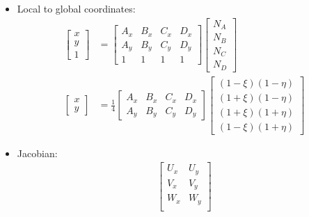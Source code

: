 \documentclass[10pt]{article}
\begin{document}
\begin{itemize}
    \item Local to global coordinates:
        \begin{align}
            \begin{bmatrix}
                x \\
                y \\
                1
            \end{bmatrix}
            &=
            \begin{bmatrix}
                A_x & B_x & C_x & D_x \\
                A_y & B_y & C_y & D_y \\
                1 & 1 & 1 & 1
            \end{bmatrix} 
            \begin{bmatrix}
                N_A \\
                N_B \\
                N_C \\
                N_D
            \end{bmatrix} \\
            \begin{bmatrix}
                x \\
                y 
            \end{bmatrix}
            &=
            \frac{1}{4}
            \begin{bmatrix}
                A_x & B_x & C_x & D_x \\
                A_y & B_y & C_y & D_y
            \end{bmatrix} 
            \begin{bmatrix}
                (1 - \xi)(1 - \eta) \\
                (1 + \xi)(1 - \eta) \\
                (1 + \xi)(1 + \eta) \\
                (1 - \xi)(1 + \eta) 
            \end{bmatrix}
        \end{align}
    \item Jacobian:
        \begin{align}
            \begin{bmatrix}
                U_x & U_y \\
                V_x & V_y \\
                W_x & W_y \\
            \end{bmatrix}

\end{align}
\end{itemize}
\end{document}
